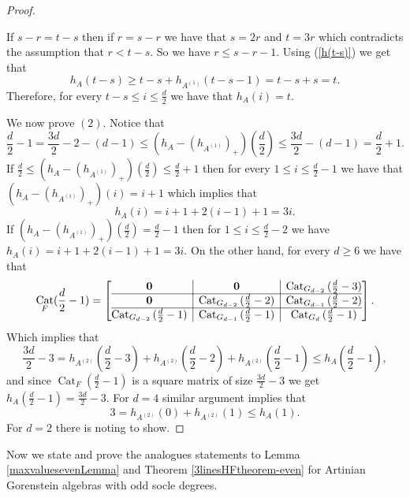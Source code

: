 \documentclass[12pt]{amsart}
\numberwithin{equation}{section}
\theoremstyle{plain} \newtheorem{theorem}{Theorem}[section]
\theoremstyle{definition} \newtheorem{definition}[theorem]{Definition}
\DeclareMathOperator{\Cat}{Cat}\DeclareMathOperator{\B}{\mathcal{B}}
\begin{document}
\begin{proof}
\begin{itemize}
\noindent If $s-r=t-s$ then if $r= s-r$ we have that $s=2r$ and $t=3r$ which contradicts the assumption that $r<t-s$. So we have $r\leq s-r-1$. Using (\ref{h(t-s)}) we get that
$$
h_A(t-s)\geq t-s+h_{A^{(1)}}(t-s-1)= t-s+s=t .
$$ Therefore, for every $t-s\leq i\leq \frac{d}{2}$ we have that $h_A(i)=t$. 
\end{itemize}
We now prove $(2)$. Notice that 
$$\frac{d}{2}-1=\frac{3d}{2}-2 -(d-1)\leq \left(h_A-(h_{A^{(1)}})_+\right)({\frac{d}{2}})\leq \frac{3d}{2} -(d-1)=\frac{d}{2}+1.$$
If $ \frac{d}{2}\leq \left(h_A-(h_{A^{(1)}})_+\right)({\frac{d}{2}})\leq \frac{d}{2}+1$ then for every $1\leq i\leq \frac{d}{2}-1$ we have that $\left(h_A-(h_{A^{(1)}})_+\right)(i)=i+1$ which implies that
$$
h_A(i)=i+1+2(i-1)+1=3i.
$$
If $\left(h_A-(h_{A^{(1)}})_+\right)({\frac{d}{2}})= \frac{d}{2}-1$ then for $1\leq i\leq \frac{d}{2}-2$ we have $h_A(i)=i+1+2(i-1)+1=3i$. On the other hand, for every $d\geq 6$ we have that 
\begin{equation*}
\Cat_F(\frac{d}{2}-1)=\left[\begin{array}{@{}c|c|c@{}}
\mathbf{0}& \mathbf{0}&{\Cat_{G_{d-2}}{(\frac{d}{2}-3)}}
\\\hline
\mathbf{0}&\Cat_{G_{d-2}}{(\frac{d}{2}-2)}&\Cat_{G_{d-1}}{(\frac{d}{2}-2)}\\\hline
\Cat_{G_{d-2}}{(\frac{d}{2}-1)}&\Cat_{G_{d-1}}{(\frac{d}{2}-1)}&\Cat_{G_{d}}{(\frac{d}{2}-1)}
\end{array}
\right].\\
\end{equation*}
Which implies that 
 $$
 \frac{3d}{2}-3= h_{A^{(2)}}(\frac{d}{2}-3)+h_{A^{(2)}}(\frac{d}{2}-2)+h_{A^{(2)}}(\frac{d}{2}-1)\leq h_A(\frac{d}{2}-1), 
 $$
 and since  $\Cat_F(\frac{d}{2}-1)$ is a square matrix of size $\frac{3d}{2}-3$ we get  $h_A(\frac{d}{2}-1)=\frac{3d}{2}-3$. For $d=4$ similar argument implies that 
  $$
3= h_{A^{(2)}}(0)+h_{A^{(2)}}(1)\leq h_A(1).
 $$
For $d=2$ there is noting to show.
\end{proof}
Now we state and prove the analogues statements to Lemma \ref{maxvaluesevenLemma} and Theorem \ref{3linesHFtheorem-even} for Artinian Gorenstein  algebras with odd socle degrees.
\end{document}
